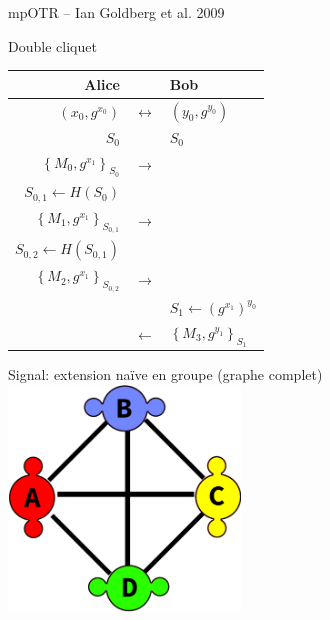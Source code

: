 \documentclass{beamer}
\newcommand{\la}{\leftarrow}
\newcommand{\Lla}{\longleftarrow}
\newcommand{\Lra}{\longrightarrow}
\newcommand{\Llra}{\longleftrightarrow}
\newcommand{\set}[1]{\left\{ #1 \right\}}
\begin{document}
\begin{frame}{mpOTR – Ian Goldberg et al. 2009~\cite{mpotr}}
\begin{frame}{Double cliquet}
	\center
	\begin{tabular}{rcl}
		Alice                           &         & Bob                       \\
		\hline
    $(x_0, g^{x_0})$                & $\Llra$ & $(y_0, g^{y_0})$          \\
		\hline
		$S_0$                           &         & $S_0$                     \\
		\hline
		$\set{M_0, g^{x_1}}_{S_0}$      & $\Lra$  &                           \\
		\hline
		$S_{0, 1} \la H(S_0)$           &         &                           \\
		\hline
		$\set{M_1, g^{x_1}}_{S_{0, 1}}$ & $\Lra$  &                           \\
		\hline
		$S_{0, 2} \la H(S_{0, 1})$      &         &                           \\
		\hline
		$\set{M_2, g^{x_1}}_{S_{0, 2}}$ & $\Lra$  &                           \\
		\hline
		                                &         & $S_1 \la (g^{x_1})^{y_0}$ \\
		\hline
		                                & $\Lla$  & $\set{M_3, g^{y_1}}_{S_1}$
	\end{tabular}
\end{frame}

\begin{frame}{Signal: extension naïve en groupe (graphe complet)}
	\center
	\includegraphics[height=6cm]{img/group_p2p.png}
\end{frame}


\end{frame}
\end{document}
